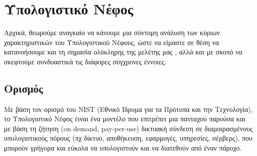 \documentclass{article}
\begin{document}
\section{Υπολογιστικό Νέφος}
Αρχικά, θεωρούμε αναγκαίο να κάνουμε μια σύντομη ανάλυση των κύριων
χαρακτηριστικών του Υπολογιστικού Νέφους, ώστε να είμαστε σε θέση να
κατανοήσουμε και τη σημασία ολόκληρης της μελέτης μας , αλλά και με σκοπό
να σκεφτούμε συνδυαστικά τις διάφορες σύγχρονες έννοιες.
\subsection{Ορισμός}
Με βάση τον ορισμό του NIST
(Εθνικό Ίδρυμα για τα Πρότυπα και την Τεχνολογία),
το Υπολογιστικό Νέφος έιναι ένα μοντέλο που επιτρέπει μια πανταχού παρούσα
και με βάση τη ζήτηση (on demand,
pay-per-use) δικτυακή σύνδεση σε διαμοιρασμένους
υπολογιστικούς πόρους (πχ δίκτυο, αποθήκευση, εφαρμογές, υπηρεσίες,
σέρβερς), που μπορούν γρήγορα και εύκολα να υπολογιστούν και να διατεθούν
από έναν πάροχο.
\end{document}
